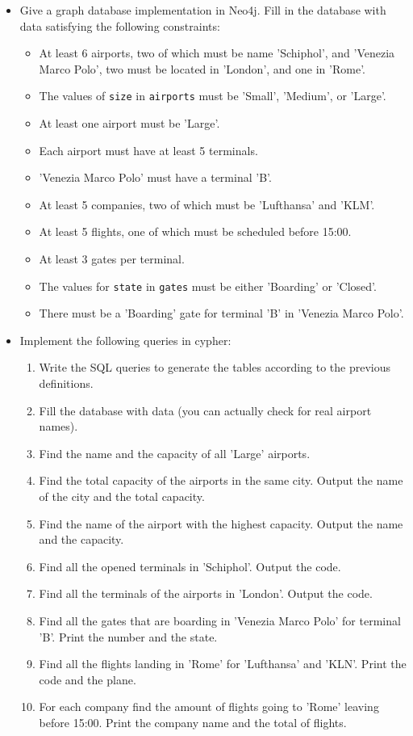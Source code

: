 \documentclass[10pt,a4paper]{article}
\begin{document}
\begin{itemize}[noitemsep]
	\item Give a graph database implementation in Neo4j. Fill in the database with data satisfying the following constraints:
		\begin{itemize}
			\item At least 6 airports, two of which must be name 'Schiphol', and 'Venezia Marco Polo', two must be located in 'London', and one in 'Rome'.
			\item The values of \texttt{size} in \texttt{airports} must be 'Small', 'Medium', or 'Large'.
			\item At least one airport must be 'Large'.
			\item Each airport must have at least 5 terminals.
			\item 'Venezia Marco Polo' must have a terminal 'B'.
			\item At least 5 companies, two of which must be 'Lufthansa' and 'KLM'.
			\item At least 5 flights, one of which must be scheduled before 15:00.
			\item At least 3 gates per terminal.
			\item The values for \texttt{state} in \texttt{gates} must be either 'Boarding' or 'Closed'.
			\item There must be a 'Boarding' gate for terminal 'B' in 'Venezia Marco Polo'.
		\end{itemize}
	\item Implement the following queries in cypher:
		\begin{enumerate}[noitemsep]
			\item Write the SQL queries to generate the tables according to the previous definitions.
			\item Fill the database with data (you can actually check for real airport names).
			\item Find the name and the capacity of all 'Large' airports.
			\item Find the total capacity of the airports in the same city. Output the name of the city and the total capacity.
			\item Find the name of the airport with the highest capacity. Output the name and the capacity.
			\item Find all the opened terminals in 'Schiphol'. Output the code.
			\item Find all the terminals of the airports in 'London'. Output the code.
			\item Find all the gates that are boarding in 'Venezia Marco Polo' for terminal 'B'. Print the number and the state.
			\item Find all the flights landing in 'Rome' for 'Lufthansa' and 'KLN'. Print the code and the plane.
			\item For each company find the amount of flights going to 'Rome' leaving before 15:00. Print the company name and the total of flights.
		\end{enumerate}
\end{itemize}
\end{document}
